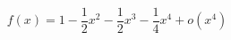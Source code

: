 \begin{displaymath}
  f(x) = 1 - \frac{1}{2}x^2 - \frac{1}{2}x^3 -\frac{1}{4}x^4 + o(x^4)
\end{displaymath}
